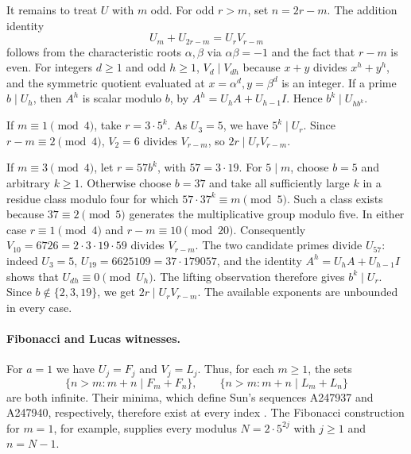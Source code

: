 \documentclass[11pt,a4paper]{article}
\theoremstyle{remark}\newtheorem{remark}[theorem]{Remark}
\numberwithin{equation}{section}
\begin{document}
It remains to treat $U$ with $m$ odd. For odd $r>m$, set $n=2r-m$.
The addition identity
\[
 U_m+U_{2r-m}=U_r V_{r-m}
\]
follows from the characteristic roots $\alpha,\beta$ via
$\alpha\beta=-1$ and the fact that $r-m$ is even. For integers $d\ge1$
and odd $h\ge1$, $V_d\mid V_{dh}$ because $x+y$ divides $x^h+y^h$,
and the symmetric quotient evaluated at $x=\alpha^d,y=\beta^d$
is an integer. If a prime $b\mid U_h$, then $A^h$ is scalar modulo
$b$, by $A^h=U_h A+U_{h-1}I$. Hence $b^k\mid U_{h b^k}$.

If $m\equiv1\pmod4$, take $r=3\cdot5^k$. As $U_3=5$, we have
$5^k\mid U_r$. Since $r-m\equiv2\pmod4$, $V_2=6$ divides
$V_{r-m}$, so $2r\mid U_r V_{r-m}$.

If $m\equiv3\pmod4$, let $r=57b^k$, with $57=3\cdot19$.
For $5\mid m$, choose $b=5$ and arbitrary $k\ge1$.
Otherwise choose $b=37$ and take all sufficiently large $k$
in a residue class modulo four for which $57\cdot37^k\equiv m\pmod5$.
Such a class exists because $37\equiv2\pmod5$ generates the
multiplicative group modulo five. In either case $r\equiv1\pmod4$
and $r-m\equiv10\pmod{20}$. Consequently $V_{10}=6726=2\cdot3\cdot19\cdot59$
divides $V_{r-m}$. The two candidate primes divide $U_{57}$: indeed
$U_3=5$, $U_{19}=6625109=37\cdot179057$, and the identity
$A^h=U_hA+U_{h-1}I$ shows that $U_{dh}\equiv0\pmod{U_h}$.
The lifting observation therefore gives $b^k\mid U_r$.
Since $b\notin\{2,3,19\}$, we get $2r\mid U_r V_{r-m}$.
The available exponents are unbounded in every case.

\paragraph{Fibonacci and Lucas witnesses.}
For $a=1$ we have $U_j=F_j$ and $V_j=L_j$. Thus, for each $m\ge1$,
the sets
\[
 \{n>m:m+n\mid F_m+F_n\},\qquad
 \{n>m:m+n\mid L_m+L_n\}
\]
are both infinite. Their minima, which define Sun's sequences
A247937 and A247940, respectively, therefore exist at every index
\cite{SunOEISF,SunOEISL}. The Fibonacci construction for $m=1$,
for example, supplies every modulus $N=2\cdot5^{2j}$ with $j\ge1$
and $n=N-1$.
\end{document}
